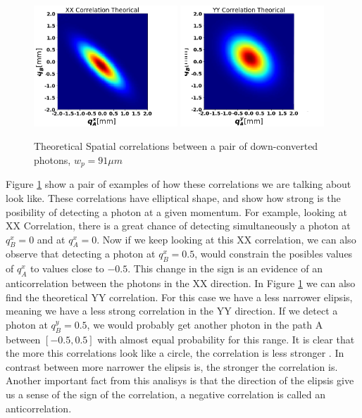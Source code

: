 \begin{figure}[h!]
\centering
{  \includegraphics[width=0.48\textwidth]{Figures/theoricalxx.png} }
{  \includegraphics[width=0.48\textwidth]{Figures/theoricalyy.png} }
\caption{Theoretical Spatial correlations between a pair of down-converted photons, $w_p=91\mu m$}
 \label{fig:correThe}
\end{figure}
Figure \ref{fig:correThe} show a pair of examples of how these correlations we are talking about look like. These correlations have elliptical shape,
and show how strong is the posibility of detecting a photon at a given momentum. For example, looking 
at XX Correlation, there is a great chance
of detecting simultaneously a photon at $q^x_B=0$ and at $q^x_A=0$. Now if we keep looking at this XX correlation, we can also 
observe that detecting a photon at $q^x_B=0.5$, would constrain the posibles values of $q^x_A$ to values close to $-0.5$. This change in the sign
is an evidence of an anticorrelation between the photons in the XX direction. In Figure \ref{fig:correThe} we can also find the theoretical YY correlation. For this case we have a less narrower elipsis, meaning 
we have a less strong correlation in the YY direction. If we detect a photon at $q^y_B=0.5$, we would probably get 
another photon in the path A between $[-0.5,0.5]$ with almost equal probability for this range. It is clear that the more this correlations 
look like a circle, the correlation is less stronger . In contrast between more narrower the elipsis is, the stronger the correlation is. 
Another important fact from this analisys is that the direction of the elipsis give us a sense of the sign of the correlation, a negative correlation
is called an anticorrelation.



